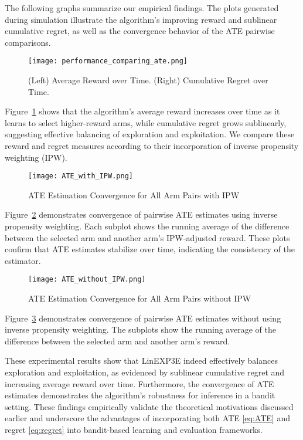 The following graphs summarize our empirical findings. The plots generated during simulation illustrate the algorithm's improving reward and sublinear cumulative regret, as well as the convergence behavior of the ATE pairwise comparisons.

\begin{figure}[H]
\centering
\texttt{[image: performance\_comparing\_ate.png]}
\caption{(Left) Average Reward over Time. (Right) Cumulative Regret over Time.}
\label{fig:reward_regret}
\end{figure}

Figure~\ref{fig:reward_regret} shows that the algorithm’s average reward increases over time as it learns to select higher-reward arms, while cumulative regret grows sublinearly, suggesting effective balancing of exploration and exploitation. We compare these reward and regret measures according to their incorporation of inverse propensity weighting (IPW).

\begin{figure}[H]
\centering
\texttt{[image: ATE\_with\_IPW.png]}
\caption{ATE Estimation Convergence for All Arm Pairs with IPW}
\label{fig:ate_pairs}
\end{figure}

Figure~\ref{fig:ate_pairs} demonstrates convergence of pairwise ATE estimates using inverse propensity weighting. Each subplot shows the running average of the difference between the selected arm and another arm’s IPW-adjusted reward. These plots confirm that ATE estimates stabilize over time, indicating the consistency of the estimator.

\begin{figure}[H]
\centering
\texttt{[image: ATE\_without\_IPW.png]}
\caption{ATE Estimation Convergence for All Arm Pairs without IPW}
\label{fig:ate_pairs_no_ipw}
\end{figure}

Figure~\ref{fig:ate_pairs_no_ipw} demonstrates convergence of pairwise ATE estimates without using inverse propensity weighting. The subplots show the running average of the difference between the selected arm and another arm’s reward.

These experimental results show that LinEXP3E indeed effectively balances exploration and exploitation, as evidenced by sublinear cumulative regret and increasing average reward over time. Furthermore, the convergence of ATE estimates demonstrates the algorithm’s robustness for inference in a bandit setting. These findings empirically validate the theoretical motivations discussed earlier and underscore the advantages of incorporating both ATE \ref{eq:ATE} and regret \ref{eq:regret} into bandit-based learning and evaluation frameworks.